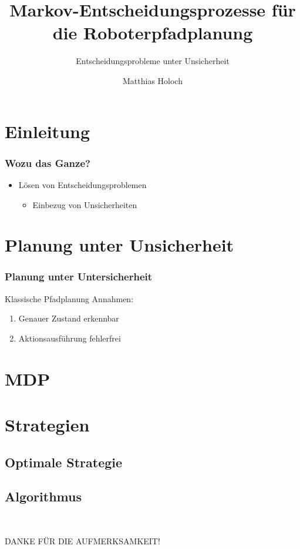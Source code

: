 \documentclass[18pt]{beamer}
\title[MDP Pfadplanung]{Markov-Entscheidungsprozesse für die Roboterpfadplanung}
\subtitle{Entscheidungsprobleme unter Unsicherheit} %
\author{Matthias Holoch}
\institute{Proseminar Anthropomatik: Von der Theorie zur Anwendung}
\begin{document}

\begin{frame}
	\titlepage
\end{frame}


\section{Einleitung}
\begin{frame}
	\frametitle{Wozu das Ganze?}
	\begin{itemize}
		\item Lösen von Entscheidungsproblemen 
		\begin{itemize}
			\item Einbezug von Unsicherheiten
		\end{itemize}
	\end{itemize}
\end{frame}

\section{Planung unter Unsicherheit}
\begin{frame}
	\frametitle{Planung unter Untersicherheit}
	\begin{block}{Klassische Pfadplanung}
		Annahmen:
		\begin{enumerate}
		\item Genauer Zustand erkennbar
		\item Aktionsausführung fehlerfrei
		\end{enumerate}
	\end{block}
\end{frame}

\section{MDP}

\section{Strategien}
\subsection{Optimale Strategie}
\subsection{Algorithmus}

\begin{frame}{~}
	\begin{center}
		\huge{DANKE FÜR DIE AUFMERKSAMKEIT!}
	\end{center}
\end{frame}
\end{document}
